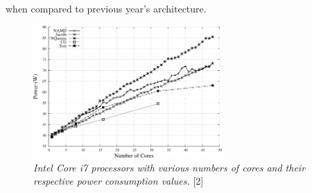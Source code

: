 \documentclass[conference]{IEEEtran}
\begin{document}
when compared to previous year's architecture.
\begin{figure}[H]
    \centering
    \includegraphics[width=7.2cm]{imgs/powerconsumption-cpu.png}
    \caption{\textit{Intel Core i7 processors with various numbers of cores and their respective power consumption values.} [2]}  
    \label{fig:picture}
\end{figure}
\end{document}
